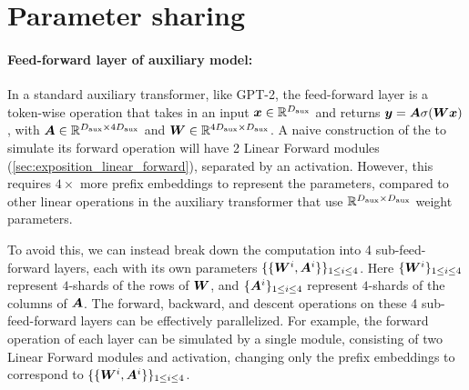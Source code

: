 \section{Parameter sharing}\label{sec:parameter_sharing_app}

\paragraph{Feed-forward layer of auxiliary model:} In a standard auxiliary transformer, like GPT-2, the feed-forward layer is a token-wise operation that takes in an input ${\bm{x}} \in \mathbb{R}^{D_{\text{aux}}}$ and returns ${\bm{y}} = {\bm{A}} \sigma( {\bm{W}} {\bm{x}} )$, with ${\bm{A}} \in \mathbb{R}^{D_{\text{aux}} \times 4D_{\text{aux}}}$ and ${\bm{W}} \in \mathbb{R}^{4D_{\text{aux}} \times D_{\text{aux}}}$. 
A naive construction of the \simulator to simulate its forward operation will have 2  Linear Forward modules (\cref{sec:exposition_linear_forward}), separated by an activation. However, this requires $4\times$ more prefix embeddings to represent the parameters, compared to other linear operations in the auxiliary transformer that use $ \mathbb{R}^{D_{\text{aux}} \times D_{\text{aux}}}$ weight parameters. 




To avoid this, we can instead break down the computation into 4 sub-feed-forward layers, each with its own parameters $\{\{{\bm{W}}^i, {\bm{A}}^i\}\}_{1 \leq i \leq 4}$. Here $\{{\bm{W}}^i\}_{1 \leq i \leq 4}$ represent $4$-shards of the rows of ${\bm{W}}$, and $\{{\bm{A}}^i\}_{1 \leq i \leq 4}$ represent $4$-shards of the columns of ${\bm{A}}$. The forward, backward, and descent operations on these 4 sub-feed-forward layers can be effectively parallelized. For example, the forward operation of each layer can be simulated by a single \simulator module, consisting of two Linear Forward modules and activation, changing only the prefix embeddings to correspond to $\{\{{\bm{W}}^i, {\bm{A}}^i\}\}_{1 \leq i \leq 4}$. 